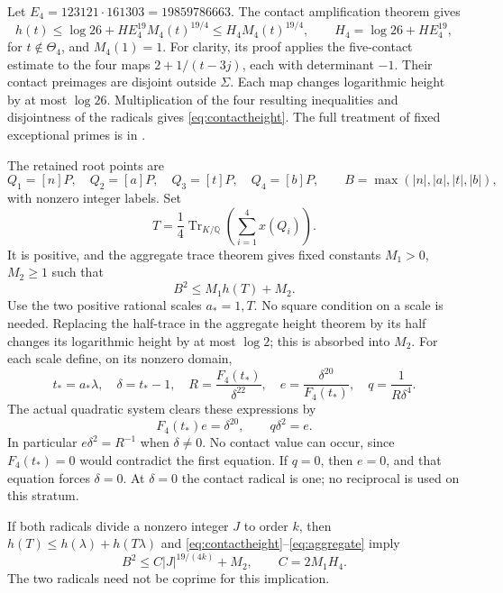 \documentclass[11pt,a4paper]{article}
\newcommand{\Q}{\mathbb Q}\newcommand{\Z}{\mathbb Z}\newcommand{\HH}{\mathcal H}
\DeclareMathOperator{\Tr}{Tr}\DeclareMathOperator{\Nm}{Nm}
\begin{document}
Let $E_4=123121\cdot161303=19859786663$. The contact amplification
 theorem gives
\begin{equation}\label{eq:contactheight}
 h(t)\le\log26+HE_4^{19}M_4(t)^{19/4}
       \le H_4M_4(t)^{19/4},\qquad
 H_4=\log26+HE_4^{19},
\end{equation}
for $t\notin\Theta_4$, and $M_4(1)=1$.
For clarity, its proof applies the five-contact estimate to the four
maps $2+1/(t-3j)$, each with determinant $-1$. Their contact preimages
are disjoint outside $\Sigma$. Each map changes logarithmic height
by at most $\log26$. Multiplication of the four resulting inequalities
and disjointness of the radicals gives \eqref{eq:contactheight}.
The full treatment of fixed exceptional primes is in \cite{Contacts}.

The retained root points are
\[
 Q_1=[n]P,\quad Q_2=[a]P,\quad Q_3=[t]P,\quad Q_4=[b]P,
 \qquad B=\max(|n|,|a|,|t|,|b|),
\]
with nonzero integer labels. Set
\[
 T=\frac14\Tr_{K/\Q}\left(\sum_{i=1}^4x(Q_i)\right).
\]
It is positive, and the aggregate trace theorem gives fixed constants
$M_1>0$, $M_2\ge1$ such that
\begin{equation}\label{eq:aggregate}
                         B^2\le M_1h(T)+M_2.
\end{equation}
Use the two positive rational scales $a_*=1,T$. No square condition
on a scale is needed. Replacing the half-trace in the aggregate
height theorem by its half changes its logarithmic height by at
most $\log2$; this is absorbed into $M_2$.
For each scale define, on its nonzero domain,
\begin{equation}\label{eq:detector}
 t_*=a_*\lambda,\quad \delta=t_*-1,\quad
 R=\frac{F_4(t_*)}{\delta^{22}},\quad
 e=\frac{\delta^{20}}{F_4(t_*)},\quad
 q=\frac1{R\delta^4}.
\end{equation}
The actual quadratic system clears these expressions by
\begin{equation}\label{eq:clearing}
             F_4(t_*)e=\delta^{20},\qquad q\delta^2=e.
\end{equation}
In particular $e\delta^2=R^{-1}$ when $\delta\ne0$.
No contact value can occur, since $F_4(t_*)=0$ would contradict the
first equation. If $q=0$, then $e=0$, and that equation forces
$\delta=0$. At $\delta=0$ the contact radical is one; no reciprocal
is used on this stratum.

If both radicals divide a nonzero integer $J$ to order $k$, then
$h(T)\le h(\lambda)+h(T\lambda)$ and
\eqref{eq:contactheight}--\eqref{eq:aggregate} imply
\begin{equation}\label{eq:heighttransfer}
 B^2\le C|J|^{19/(4k)}+M_2,\qquad C=2M_1H_4.
\end{equation}
The two radicals need not be coprime for this implication.
\end{document}
